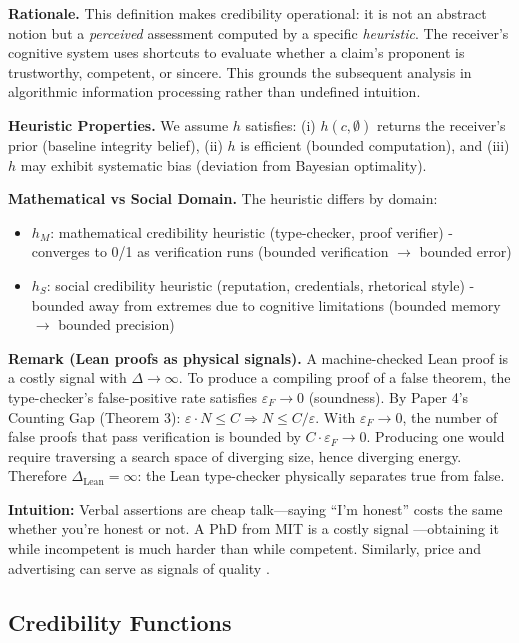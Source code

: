\textbf{Rationale.} This definition makes credibility operational: it is not an 
abstract notion but a \emph{perceived} assessment computed by a specific \emph{heuristic}. 
The receiver's cognitive system uses shortcuts to evaluate whether a claim's 
proponent is trustworthy, competent, or sincere. This grounds the subsequent 
analysis in algorithmic information processing rather than undefined intuition.

\textbf{Heuristic Properties.} We assume $h$ satisfies: (i) $h(c, \emptyset)$ returns 
the receiver's prior (baseline integrity belief), (ii) $h$ is efficient (bounded 
computation), and (iii) $h$ may exhibit systematic bias (deviation from Bayesian optimality).

\textbf{Mathematical vs Social Domain.} The heuristic differs by domain:
\begin{itemize}
\item $h_M$: mathematical credibility heuristic (type-checker, proof verifier) 
      - converges to 0/1 as verification runs (bounded verification $\to$ bounded error)
\item $h_S$: social credibility heuristic (reputation, credentials, rhetorical style)
      - bounded away from extremes due to cognitive limitations (bounded memory $\to$ bounded precision)
\end{itemize}

\textbf{Remark (Lean proofs as physical signals).}
A machine-checked Lean proof is a costly signal with $\Delta \to \infty$. To produce a
compiling proof of a false theorem, the type-checker's false-positive rate satisfies
$\varepsilon_F \to 0$ (soundness). By Paper 4's Counting Gap (Theorem 3):
$\varepsilon \cdot N \leq C \Rightarrow N \leq C / \varepsilon$. With $\varepsilon_F \to 0$,
the number of false proofs that pass verification is bounded by $C \cdot \varepsilon_F \to 0$.
Producing one would require traversing a search space of diverging size, hence diverging energy.
Therefore $\Delta_{\text{Lean}} = \infty$: the Lean type-checker physically separates true from false.

\textbf{Intuition:} Verbal assertions are cheap talk---saying ``I'm
honest'' costs the same whether you're honest or not. A PhD from MIT is
a costly signal \cite{spence1973job}---obtaining it while incompetent is much harder than
while competent. Similarly, price and advertising can serve as signals of quality \cite{milgrom1986price}.

\subsection{Credibility Functions}\label{credibility-functions}

